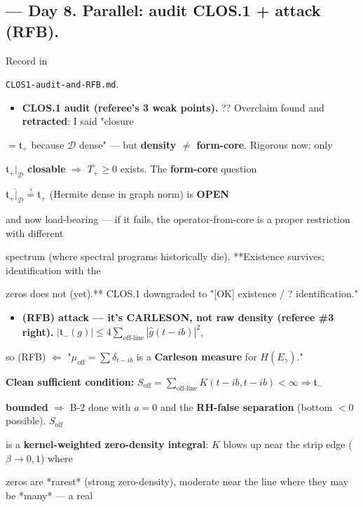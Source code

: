 \documentclass[10pt]{article}
\begin{document}
\subsection*{ --- Day 8. Parallel: audit CLOS.1 + attack (RFB).}
Record in\par
\texttt{CLOS1-audit-and-RFB.md}.\par
\begin{itemize}
\item \textbf{CLOS.1 audit (referee's 3 weak points).} ?? Overclaim found and \textbf{retracted}: I said "closure
\end{itemize}
  $=\mathfrak t_+$ because $\mathcal D$ dense" --- but \textbf{density $\ne$ form-core}. Rigorous now: only\par
  $\mathfrak t_+|_{\mathcal D}$ \textbf{closable} \ensuremath{\Rightarrow} $\overline{T_+}\ge0$ exists. The \textbf{form-core} question\par
  $\overline{\mathfrak t_+|_{\mathcal D}}\overset?=\mathfrak t_+$ (Hermite dense in graph norm) is \textbf{OPEN}\par
  and now load-bearing --- if it fails, the operator-from-core is a proper restriction with different\par
  spectrum (where spectral programs historically die). **Existence survives; identification with the\par
  zeros does not (yet).** CLOS.1 downgraded to "[OK] existence / ? identification."\par
\begin{itemize}
\item \textbf{(RFB) attack --- it's CARLESON, not raw density (referee \#3 right).} $|\mathfrak t_-(g)|\le 4\sum_{\text{off-line}}|\widehat g(t-ib)|^2$,
\end{itemize}
  so (RFB) $\Leftarrow$ "$\mu_{\mathrm{off}}=\sum\delta_{t-ib}$ is a \textbf{Carleson measure} for $H(E_\gamma)$."\par
  \textbf{Clean sufficient condition:} $S_{\mathrm{off}}=\sum_{\text{off-line}}K(t-ib,t-ib)<\infty\Rightarrow\mathfrak t_-$\par
  \textbf{bounded} $\Rightarrow$ B-2 done with $a=0$ and the \textbf{RH-false separation} (bottom $<0$ possible). $S_{\mathrm{off}}$\par
  is a \textbf{kernel-weighted zero-density integral}: $K$ blows up near the strip edge ($\beta\to0,1$) where\par
  zeros are *rarest* (strong zero-density), moderate near the line where they may be *many* --- a real\par
\end{document}
